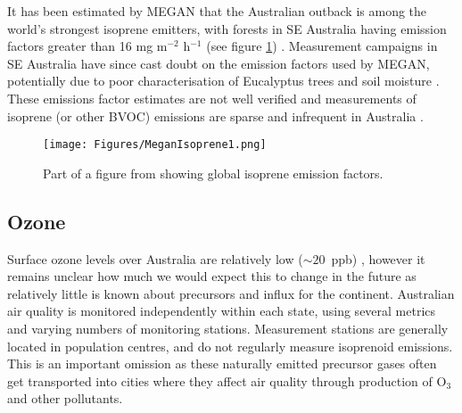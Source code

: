   
  It has been estimated by MEGAN that the Australian outback is among the world's strongest isoprene emitters, with forests in SE Australia having emission factors greater than 16 mg m$^{-2}$ h$^{-1}$ (see figure \ref{LR:Aus:fig_MEGAN_EF}) \parencite{Guenther2006,Guenther2012}.
  Measurement campaigns in SE Australia have since cast doubt on the emission factors used by MEGAN, potentially due to poor characterisation of Eucalyptus trees and soil moisture \parencite{Emmerson2016,Emmerson2019}.
  These emissions factor estimates are not well verified and measurements of isoprene (or other BVOC) emissions are sparse and infrequent in Australia \parencite{Sindelarova2014, Bauwens2016}.

  \begin{figure}
    \texttt{[image: Figures/MeganIsoprene1.png]}
    \caption{ Part of a figure from \textcite{Guenther2006} showing global isoprene emission factors. }
    \label{LR:Aus:fig_MEGAN_EF}
  \end{figure}
  
  
  \subsection{Ozone}
    Surface ozone levels over Australia are relatively low ($\sim20$~ppb) \parencite{Young2018}, however it remains unclear how much we would expect this to change in the future as relatively little is known about precursors and influx for the continent.
    Australian air quality is monitored independently within each state, using several metrics and varying numbers of monitoring stations.
    Measurement stations are generally located in population centres, and do not regularly measure isoprenoid emissions. 
    This is an important omission as these naturally emitted precursor gases often get transported into cities where they affect air quality through production of O$_3$ and other pollutants.
    
